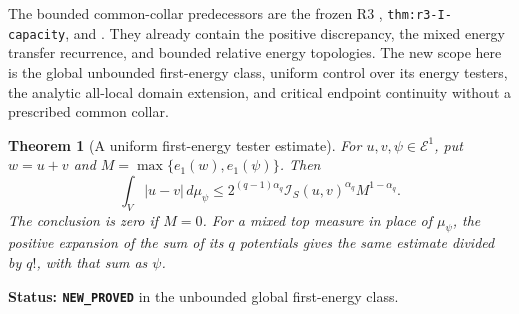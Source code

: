 \documentclass[11pt,a4paper]{article}
\numberwithin{equation}{section}
\newtheorem{theorem}{Theorem}[section]
\theoremstyle{definition}
\theoremstyle{remark}
\begin{document}
The bounded common-collar predecessors are the frozen R3
,
\texttt{thm:r3-I-capacity}, and
.
They already contain the positive discrepancy, the mixed
energy transfer recurrence, and bounded relative energy
topologies. The new scope here is the global unbounded
first-energy class, uniform control over its energy testers,
the analytic all-local domain extension, and critical
endpoint continuity without a prescribed common collar.

\begin{theorem}[A uniform first-energy tester estimate]
\label{thm:r11-first-energy-uniform-tester}
For $u,v,\psi\in\mathcal E^1$, put $w=u+v$ and
$M=\max\{e_1(w),e_1(\psi)\}$. Then
\[
 \boxed{\quad
 \int_V|u-v|\,d\mu_\psi
   \leq 2^{(q-1)\alpha_q}
          \mathscr I_S(u,v)^{\alpha_q}M^{1-\alpha_q}.
 \quad}
 \tag{EV1}
\]
The conclusion is zero if $M=0$. For a mixed top measure
in place of $\mu_\psi$, the positive expansion of the sum
of its $q$ potentials gives the same estimate divided by
$q!$, with that sum as $\psi$.
\end{theorem}

\noindent\textbf{Status: \texttt{NEW\_PROVED}} in the
unbounded global first-energy class.
\end{document}
